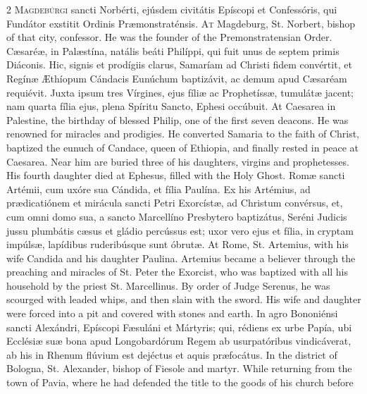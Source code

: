 \begin{paracol}{2}
\lettrine[lines=2]{M}{agdebúrgi} sancti 
 Norbérti, ejúsdem civitátis Epíscopi et Confessóris, qui Fundátor exstitit 
 Ordinis Præmonstraténsis.
\switchcolumn
{}
\lettrine[lines=2]{A}{t} Magdeburg, St. Norbert, bishop of 
 that city, confessor. He was the founder of the Premonstratensian 
 Order.
\switchcolumn*
{}
Cæsaréæ, in Palæstína, 
 natális beáti Philíppi, qui fuit unus de septem primis Diáconis. Hic, 
 signis et prodígiis clarus, Samaríam ad Christi fidem convértit, et Regínæ 
 Æthíopum Cándacis Eunúchum baptizávit, ac demum apud Cæsaréam requiévit. 
 Juxta ipsum tres Vírgines, ejus fíliæ ac Prophetíssæ, tumulátæ jacent; nam 
 quarta fília ejus, plena Spíritu Sancto, Ephesi occúbuit.
\switchcolumn
{}
At Caesarea in Palestine, the 
 birthday of blessed Philip, one of the first seven deacons. He was 
 renowned for miracles and prodigies. He converted Samaria to the faith 
 of Christ, baptized the eunuch of Candace, queen of Ethiopia, and finally 
 rested in peace at Caesarea. Near him are buried three of his 
 daughters, virgins and prophetesses. His fourth daughter died at 
 Ephesus, filled with the Holy Ghost.
\switchcolumn*
{}
Romæ sancti Artémii, 
 cum uxóre sua Cándida, et fília Paulína. Ex his Artémius, ad 
 prædicatiónem et mirácula sancti Petri Exorcístæ, ad Christum convérsus, et, 
 cum omni domo sua, a sancto Marcellíno Presbytero baptizátus, Seréni Judicis 
 jussu plumbátis cæsus et gládio percússus est; uxor vero ejus et fília, in 
 cryptam impúlsæ, lapídibus ruderibúsque sunt óbrutæ.
\switchcolumn
{}
At Rome, St. Artemius, with his wife 
 Candida and his daughter Paulina. Artemius became a believer through 
 the preaching and miracles of St. Peter the Exorcist, who was baptized with 
 all his household by the priest St. Marcellinus. By order of Judge 
 Serenus, he was scourged with leaded whips, and then slain with the sword. 
 His wife and daughter were forced into a pit and covered with stones and 
 earth.
\switchcolumn*
{}
In agro Bononiénsi 
 sancti Alexándri, Epíscopi Fæsuláni et Mártyris; qui, rédiens ex urbe Papía, 
 ubi Ecclésiæ suæ bona apud Longobardórum Regem ab usurpatóribus vindicáverat, 
 ab his in Rhenum flúvium est dejéctus et aquis præfocátus.
\switchcolumn
{}
In the district of Bologna, St. 
 Alexander, bishop of Fiesole and martyr. While returning from the town 
 of Pavia, where he had defended the title to the goods of his church before 

\end{paracol}
